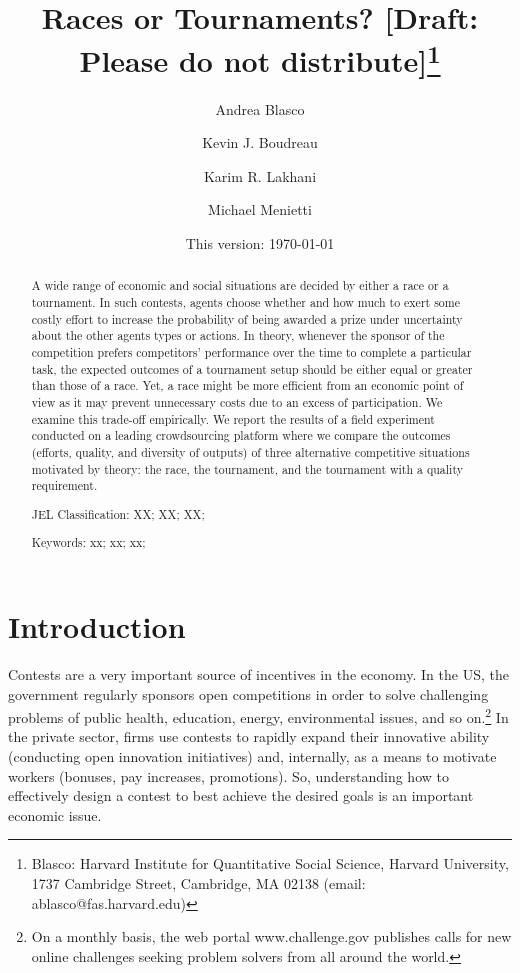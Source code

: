 \documentclass[12pt, titlepage, draft]{article} \usepackage[utf8]{inputenc}                           \usepackage[english]{babel}                           \usepackage{amsmath,amssymb,amsfonts}                 \usepackage{xcolor,tikz,graphicx,subfig}              \usepackage{rotating,multirow,array,dcolumn,booktabs} \usepackage{natbib}                                   
\title{Races or Tournaments? [Draft: Please do not distribute]\thanks{Blasco: Harvard Institute for Quantitative Social Science, Harvard University, 1737 Cambridge Street, Cambridge, MA 02138 (email: ablasco@fas.harvard.edu)}
}
\author{Andrea Blasco \and Kevin J. Boudreau \and Karim R. Lakhani \and Michael Menietti
}
\date{This version: \today
}
\begin{document}
\maketitle
\tableofcontents

\begin{abstract}

\noindent A wide range of economic and social situations are decided by either a
race or a tournament. In such contests, agents choose whether and how
much to exert some costly effort to increase the probability of being
awarded a prize under uncertainty about the other agents types or
actions. In theory, whenever the sponsor of the competition prefers
competitors' performance over the time to complete a particular task,
the expected outcomes of a tournament setup should be either equal or
greater than those of a race. Yet, a race might be more efficient from
an economic point of view as it may prevent unnecessary costs due to an
excess of participation. We examine this trade-off empirically. We
report the results of a field experiment conducted on a leading
crowdsourcing platform where we compare the outcomes (efforts, quality,
and diversity of outputs) of three alternative competitive situations
motivated by theory: the race, the tournament, and the tournament with a
quality requirement.

\smallskip\noindent 
JEL Classification: XX; XX; XX;

\smallskip\noindent 
Keywords: xx; xx; xx;
\end{abstract}


\clearpage
\section{Introduction}\label{introduction}

Contests are a very important source of incentives in the economy. In
the US, the government regularly sponsors open competitions in order to
solve challenging problems of public health, education, energy,
environmental issues, and so on.\footnote{On a monthly basis, the web
  portal www.challenge.gov publishes calls for new online challenges
  seeking problem solvers from all around the world.} In the private
sector, firms use contests to rapidly expand their innovative ability
(conducting open innovation initiatives) and, internally, as a means to
motivate workers (bonuses, pay increases, promotions). So, understanding
how to effectively design a contest to best achieve the desired goals is
an important economic issue.
\end{document}
